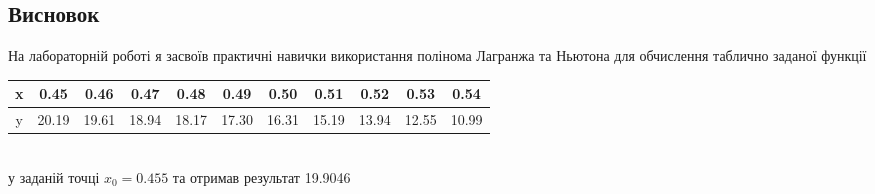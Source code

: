 \documentclass{article}
\begin{document}
\begin{large}
		\section*{Висновок}
		На лабораторній роботі я засвоїв практичні навички використання полінома Лагранжа та Ньютона для обчислення таблично заданої функції
		
		\begin{tabular}{|c|c|c|c|c|c|c|c|c|c|c|}
			\hline
			x & 0.45 & 0.46 & 0.47 & 0.48 & 0.49 & 0.50 & 0.51 & 0.52 & 0.53 & 0.54 \\
			\hline
			y & 20.19 & 19.61 & 18.94 & 18.17 & 17.30 & 16.31 & 15.19 & 13.94 & 12.55 & 10.99\\
			\hline
		\end{tabular}
		\vspace{5pt}\\
		у заданій точці $x_0=0.455$ та отримав результат 19.9046

	\end{large}
\end{document}
